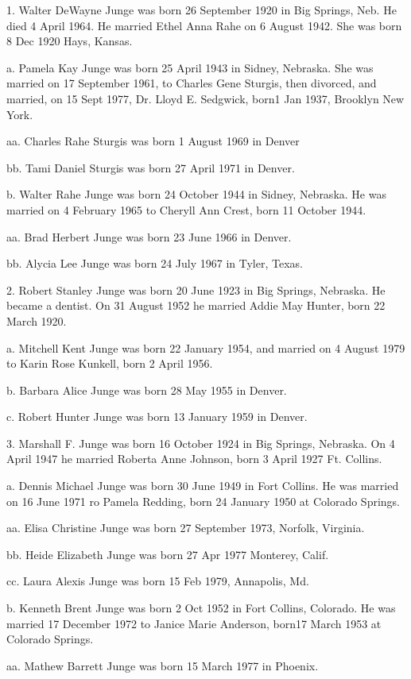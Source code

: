 \documentclass[a4paper]{article}
\begin{document}
1. Walter DeWayne Junge was born 26 September 1920 in Big Springs, Neb. He died 4 April 1964.	He married Ethel Anna Rahe on 6 August 1942.  She was born 8 Dec 1920 Hays, Kansas.

a. Pamela Kay Junge was born 25 April 1943 in Sidney, Nebraska.  She was married on 17 September 1961, to Charles Gene Sturgis, then divorced, and married, on 15 Sept 1977, Dr. Lloyd E. Sedgwick, born1 Jan 1937, Brooklyn New York.

aa. Charles Rahe Sturgis was born 1 August 1969 in Denver

bb. Tami Daniel Sturgis was born 27 April 1971 in Denver.

b. Walter Rahe Junge was born 24 October 1944 in Sidney, Nebraska.  He was married on 4 February 1965 to Cheryll Ann Crest, born 11 October 1944.
  
aa. Brad Herbert Junge was born 23 June 1966 in Denver.

bb. Alycia Lee Junge was born 24 July 1967 in Tyler, Texas.

2.  Robert Stanley Junge was born 20 June 1923 in Big Springs, Nebraska.  He became a dentist.  On 31 August 1952 he married Addie May Hunter, born 22 March 1920.
 
a. Mitchell Kent Junge was born 22 January 1954, and married on 4 August 1979 to Karin Rose Kunkell, born 2 April 1956.
 
b. Barbara Alice Junge was born 28 May 1955 in Denver.

c. Robert Hunter Junge was born 13 January 1959 in Denver.

3. Marshall F. Junge was born 16 October 1924 in Big Springs, Nebraska.  On 4 April 1947 he married Roberta Anne Johnson, born 3 April 1927 Ft. Collins.

a. Dennis Michael Junge was born 30 June 1949 in Fort Collins.  He was married on 16 June 1971 ro Pamela Redding, born 24 January 1950 at Colorado Springs.

aa. Elisa Christine Junge was born 27 September 1973, Norfolk, Virginia.
 
bb. Heide Elizabeth Junge was born 27 Apr 1977 Monterey, Calif.

cc. Laura Alexis Junge was born 15 Feb 1979, Annapolis, Md.

b. Kenneth Brent Junge was born 2 Oct 1952 in Fort Collins, Colorado. He was married 17 December 1972 to Janice Marie Anderson, born17 March 1953 at Colorado Springs.

aa. Mathew Barrett Junge was born 15 March 1977 in Phoenix.
\end{document}
